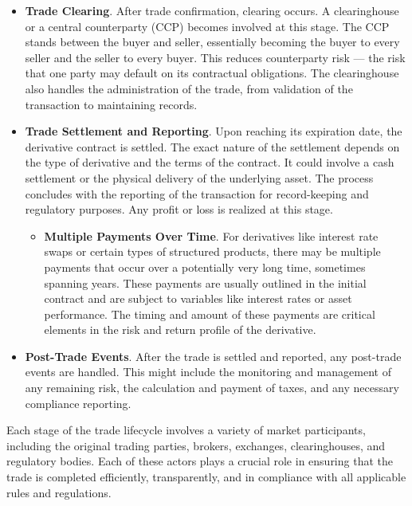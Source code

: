 \begin{itemize}
    \item \textbf{Trade Clearing}. After trade confirmation, clearing occurs. A clearinghouse or a central counterparty (CCP) becomes involved at this stage. The CCP stands between the buyer and seller, essentially becoming the buyer to every seller and the seller to every buyer. This reduces counterparty risk — the risk that one party may default on its contractual obligations. The clearinghouse also handles the administration of the trade, from validation of the transaction to maintaining records.

    \item \textbf{Trade Settlement and Reporting}. Upon reaching its expiration date, the derivative contract is settled. The exact nature of the settlement depends on the type of derivative and the terms of the contract. It could involve a cash settlement or the physical delivery of the underlying asset. The process concludes with the reporting of the transaction for record-keeping and regulatory purposes. Any profit or loss is realized at this stage.

    \begin{itemize}
        \item \textbf{Multiple Payments Over Time}. For derivatives like interest rate swaps or certain types of structured products, there may be multiple payments that occur over a potentially very long time, sometimes spanning years. These payments are usually outlined in the initial contract and are subject to variables like interest rates or asset performance. The timing and amount of these payments are critical elements in the risk and return profile of the derivative.
    \end{itemize}

    \item \textbf{Post-Trade Events}. After the trade is settled and reported, any post-trade events are handled. This might include the monitoring and management of any remaining risk, the calculation and payment of taxes, and any necessary compliance reporting.
\end{itemize}

Each stage of the trade lifecycle involves a variety of market participants, including the original trading parties, brokers, exchanges, clearinghouses, and regulatory bodies. Each of these actors plays a crucial role in ensuring that the trade is completed efficiently, transparently, and in compliance with all applicable rules and regulations.

